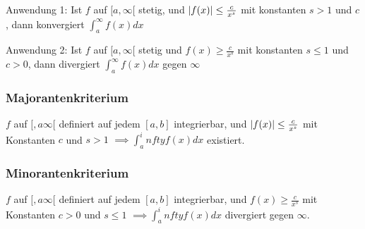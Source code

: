 Anwendung 1: Ist $f$ auf $[a,\infty[$ stetig, und $\abs{f(x)} \leq \frac{c}{x^s}$ mit konstanten $s>1$ und $c$, dann konvergiert $\int_a^\infty f(x) dx$

Anwendung 2: Ist $f$ auf $[a,\infty[$ stetig und $f(x) \geq \frac{c}{x^s}$ mit konstanten $s \leq 1$ und $c > 0$, dann divergiert $\int_a^\infty f(x) dx$ gegen $\infty$

\subsubsection{Majorantenkriterium}
$f$ auf $[,a\infty[$ definiert auf jedem $[a,b]$ integrierbar, und $\abs{f(x)} \leq \frac{c}{x^s}$ mit Konstanten $c$ und $s > 1$ $\implies \int_a^infty f(x) dx$ existiert.

\subsubsection{Minorantenkriterium}
$f$ auf $[,a\infty[$ definiert auf jedem $[a,b]$ integrierbar, und $f(x) \geq \frac{c}{x^s}$ mit Konstanten $c > 0$ und $s \leq 1$ $\implies \int_a^infty f(x) dx$ divergiert gegen $\infty$.

